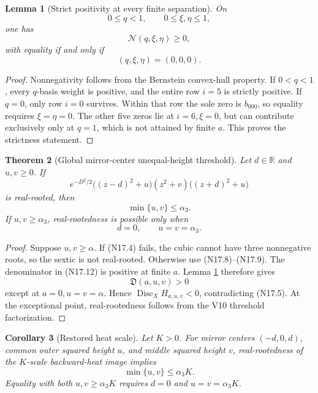\documentclass[11pt]{article}
\newtheorem{theorem}{Theorem}[section]
\newtheorem{lemma}[theorem]{Lemma}
\newtheorem{corollary}[theorem]{Corollary}
\theoremstyle{definition}
\theoremstyle{remark}
\begin{document}
\begin{lemma}[Strict positivity at every finite separation]
\label{lem:f2v17-strict}
On
\[
 0\leq q<1,\qquad 0\leq\xi,\eta\leq1,
 \tag{N17.17}
\]
one has
\[
 \mathcal N(q,\xi,\eta)\geq0,
 \tag{N17.18}
\]
with equality if and only if
\[
 (q,\xi,\eta)=(0,0,0).
 \tag{N17.19}
\]
\end{lemma}

\begin{proof}
Nonnegativity follows from the Bernstein convex-hull property.  If
\(0<q<1\), every \(q\)-basis weight is positive, and the entire row
\(i=5\) is strictly positive.  If \(q=0\), only row \(i=0\) survives.
Within that row the sole zero is \(b_{000}\), so equality requires
\(\xi=\eta=0\).  The other five zeros lie at \(i=6,\xi=0\), but can
contribute exclusively only at \(q=1\), which is not attained by finite
\(a\).  This proves the strictness statement.
\end{proof}

\begin{theorem}[Global mirror-center unequal-height threshold]
\label{thm:f2v17-mirror-unequal}
Let \(d\in\mathbb R\) and \(u,v\geq0\).  If
\[
 e^{-D^2/2}
 \bigl((z-d)^2+u\bigr)(z^2+v)\bigl((z+d)^2+u\bigr)
 \tag{N17.20}
\]
is real-rooted, then
\[
 \min\{u,v\}\leq\alpha_3.
 \tag{N17.21}
\]
If \(u,v\geq\alpha_3\), real-rootedness is possible only when
\[
 d=0,\qquad u=v=\alpha_3.
 \tag{N17.22}
\]
\end{theorem}

\begin{proof}
Suppose \(u,v\geq\alpha\).  If \textup{(N17.4)} fails, the cubic cannot
have three nonnegative roots, so the sextic is not real-rooted.  Otherwise
use \textup{(N17.8)}--\textup{(N17.9)}.  The denominator in
\textup{(N17.12)} is positive at finite \(a\).  Lemma
\ref{lem:f2v17-strict} therefore gives
\[
 \mathfrak D(a,u,v)>0
 \tag{N17.23}
\]
except at \(a=0,u=v=\alpha\).  Hence
\(\operatorname{Disc}_XH_{a,u,v}<0\), contradicting
\textup{(N17.5)}.  At the exceptional point, real-rootedness follows from
the V10 threshold factorization.
\end{proof}

\begin{corollary}[Restored heat scale]
\label{cor:f2v17-scale}
Let \(K>0\).  For mirror centers \((-d,0,d)\), common outer squared height
\(u\), and middle squared height \(v\), real-rootedness of the
\(K\)-scale backward-heat image implies
\[
 \min\{u,v\}\leq\alpha_3K.
 \tag{N17.24}
\]
Equality with both \(u,v\geq\alpha_3K\) requires
\(d=0\) and \(u=v=\alpha_3K\).
\end{corollary}
\end{document}
